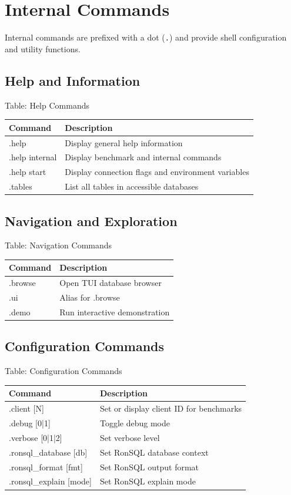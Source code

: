 \documentclass[11pt,a4paper]{report}
\begin{document}
\chapter{Internal Commands}

Internal commands are prefixed with a dot (\texttt{.}) and provide shell configuration and utility functions.

\section{Help and Information}

Table: Help Commands

\begin{tabular}{ll}
\toprule
Command & Description \\
\midrule
.help & Display general help information \\
.help internal & Display benchmark and internal commands \\
.help start & Display connection flags and environment variables \\
.tables & List all tables in accessible databases \\
\bottomrule
\end{tabular}

\section{Navigation and Exploration}

Table: Navigation Commands

\begin{tabular}{ll}
\toprule
Command & Description \\
\midrule
.browse & Open TUI database browser \\
.ui & Alias for .browse \\
.demo & Run interactive demonstration \\
\bottomrule
\end{tabular}

\section{Configuration Commands}

Table: Configuration Commands

\begin{tabular}{ll}
\toprule
Command & Description \\
\midrule
.client [N] & Set or display client ID for benchmarks \\
.debug [0|1] & Toggle debug mode \\
.verbose [0|1|2] & Set verbose level \\
.ronsql\_database [db] & Set RonSQL database context \\
.ronsql\_format [fmt] & Set RonSQL output format \\
.ronsql\_explain [mode] & Set RonSQL explain mode \\
\bottomrule
\end{tabular}
\end{document}

